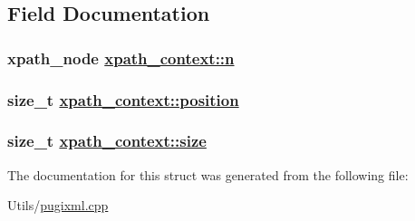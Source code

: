 \subsection{Field Documentation}
\hypertarget{structxpath__context_ce8fbb8121820bc5054605c166101273}{
\subsubsection[n]{\setlength{\rightskip}{0pt plus 5cm}xpath\_\-node \hyperlink{structxpath__context_ce8fbb8121820bc5054605c166101273}{xpath\_\-context::n}}}
\label{structxpath__context_ce8fbb8121820bc5054605c166101273}


\hypertarget{structxpath__context_dd1fc9bd16b21d3a8d7a4bd63c60af07}{
\subsubsection[position]{\setlength{\rightskip}{0pt plus 5cm}size\_\-t \hyperlink{structxpath__context_dd1fc9bd16b21d3a8d7a4bd63c60af07}{xpath\_\-context::position}}}
\label{structxpath__context_dd1fc9bd16b21d3a8d7a4bd63c60af07}


\hypertarget{structxpath__context_976ffb0eff84a7779c97e589c1785d1c}{
\subsubsection[size]{\setlength{\rightskip}{0pt plus 5cm}size\_\-t \hyperlink{structxpath__context_976ffb0eff84a7779c97e589c1785d1c}{xpath\_\-context::size}}}
\label{structxpath__context_976ffb0eff84a7779c97e589c1785d1c}




The documentation for this struct was generated from the following file:\begin{CompactItemize}
\item 
Utils/\hyperlink{pugixml_8cpp}{pugixml.cpp}\end{CompactItemize}
